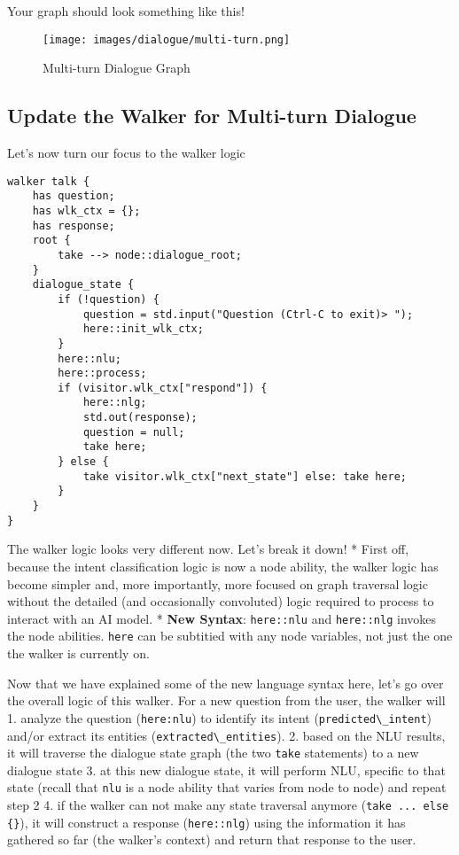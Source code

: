 Your graph should look something like this!

\begin{figure}
\centering
\texttt{[image: images/dialogue/multi-turn.png]}
\caption{Multi-turn Dialogue Graph}
\end{figure}

\hypertarget{update-the-walker-for-multi-turn-dialogue}{%
\subsection{Update the Walker for Multi-turn
Dialogue}\label{update-the-walker-for-multi-turn-dialogue}}

Let's now turn our focus to the walker logic

\begin{lstlisting}
walker talk {
    has question;
    has wlk_ctx = {};
    has response;
    root {
        take --> node::dialogue_root;
    }
    dialogue_state {
        if (!question) {
            question = std.input("Question (Ctrl-C to exit)> ");
            here::init_wlk_ctx;
        }
        here::nlu;
        here::process;
        if (visitor.wlk_ctx["respond"]) {
            here::nlg;
            std.out(response);
            question = null;
            take here;
        } else {
            take visitor.wlk_ctx["next_state"] else: take here;
        }
    }
}
\end{lstlisting}

The walker logic looks very different now. Let's break it down! * First
off, because the intent classification logic is now a node ability, the
walker logic has become simpler and, more importantly, more focused on
graph traversal logic without the detailed (and occasionally convoluted)
logic required to process to interact with an AI model. * \textbf{New
Syntax}: \passthrough{\lstinline!here::nlu!} and
\passthrough{\lstinline!here::nlg!} invokes the node abilities.
\passthrough{\lstinline!here!} can be subtitied with any node variables,
not just the one the walker is currently on.

Now that we have explained some of the new language syntax here, let's
go over the overall logic of this walker. For a new question from the
user, the walker will 1. analyze the question
(\passthrough{\lstinline!here:nlu!}) to identify its intent
(\passthrough{\lstinline!predicted\_intent!}) and/or extract its
entities (\passthrough{\lstinline!extracted\_entities!}). 2. based on
the NLU results, it will traverse the dialogue state graph (the two
\passthrough{\lstinline!take!} statements) to a new dialogue state 3. at
this new dialogue state, it will perform NLU, specific to that state
(recall that \passthrough{\lstinline!nlu!} is a node ability that varies
from node to node) and repeat step 2 4. if the walker can not make any
state traversal anymore (\passthrough{\lstinline!take ... else \{\}!}),
it will construct a response (\passthrough{\lstinline!here::nlg!}) using
the information it has gathered so far (the walker's context) and return
that response to the user.

